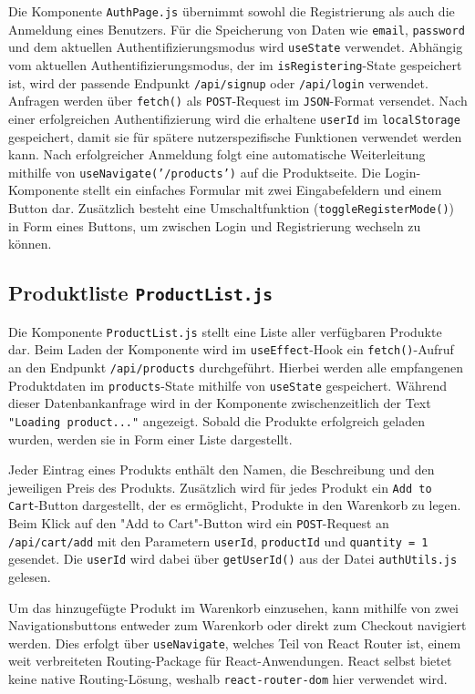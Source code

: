 \documentclass[oneside]{ausarbeitung}
\begin{document}
Die Komponente \texttt{AuthPage.js} übernimmt sowohl die Registrierung als auch die Anmeldung eines Benutzers.
Für die Speicherung von Daten wie \texttt{email}, \texttt{password} und dem aktuellen Authentifizierungsmodus wird \texttt{useState} verwendet. Abhängig vom aktuellen Authentifizierungsmodus, der im \texttt{isRegistering}-State gespeichert ist, wird der passende Endpunkt \texttt{/api/signup} oder \texttt{/api/login} verwendet.
Anfragen werden über \texttt{fetch()} als \texttt{POST}-Request im \texttt{JSON}-Format versendet.
Nach einer erfolgreichen Authentifizierung wird die erhaltene \texttt{userId} im \texttt{localStorage} gespeichert, damit sie für spätere nutzerspezifische Funktionen verwendet werden kann. Nach erfolgreicher Anmeldung folgt eine automatische Weiterleitung mithilfe von \texttt{useNavigate('/products')} auf die Produktseite.
Die Login-Komponente stellt ein einfaches Formular mit zwei Eingabefeldern und einem Button dar. Zusätzlich besteht eine Umschaltfunktion (\texttt{toggleRegisterMode()}) in Form eines Buttons, um zwischen Login und Registrierung wechseln zu können.

\subsection{Produktliste \texttt{ProductList.js}} 

Die Komponente \texttt{ProductList.js} stellt eine Liste aller verfügbaren Produkte dar. Beim Laden der Komponente wird im \texttt{useEffect}-Hook ein \texttt{fetch()}-Aufruf an den Endpunkt \texttt{/api/products} durchgeführt. Hierbei werden alle empfangenen Produktdaten im \texttt{products}-State mithilfe von \texttt{useState} gespeichert. Während dieser Datenbankanfrage wird in der Komponente zwischenzeitlich der Text \texttt{"Loading product..."} angezeigt. Sobald die Produkte erfolgreich geladen wurden, werden sie in Form einer Liste dargestellt.

Jeder Eintrag eines Produkts enthält den Namen, die Beschreibung und den jeweiligen Preis des Produkts. Zusätzlich wird für jedes Produkt ein \texttt{Add to Cart}-Button dargestellt, der es ermöglicht, Produkte in den Warenkorb zu legen. Beim Klick auf den "Add to Cart"-Button wird ein \texttt{POST}-Request an \texttt{/api/cart/add} mit den Parametern \texttt{userId}, \texttt{productId} und \texttt{quantity = 1} gesendet. Die \texttt{userId} wird dabei über \texttt{getUserId()} aus der Datei \texttt{authUtils.js} gelesen.

Um das hinzugefügte Produkt im Warenkorb einzusehen, kann mithilfe von zwei Navigationsbuttons entweder zum Warenkorb oder direkt zum Checkout navigiert werden. Dies erfolgt über \texttt{useNavigate}, welches Teil von React Router ist, einem weit verbreiteten Routing-Package für React-Anwendungen. React selbst bietet keine native Routing-Lösung, weshalb \texttt{react-router-dom} hier verwendet wird.
\end{document}
